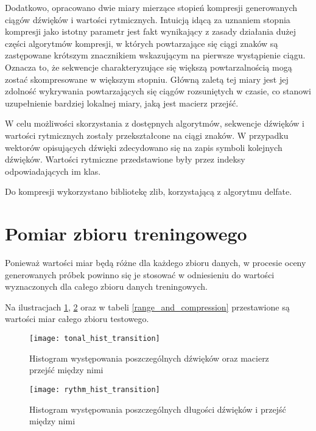 {{        Dodatkowo, opracowano dwie miary mierzące stopień kompresji generowanych ciągów dźwięków i wartości rytmicznych. 
        Intuicją idącą za uznaniem stopnia kompresji jako istotny parametr jest fakt wynikający z zasady działania dużej części
        algorytmów kompresji, w których powtarzające się ciągi znaków są zastępowane krótszym znacznikiem wskazującym na pierwsze 
        wystąpienie ciągu. 
        Oznacza to, że sekwencje charakteryzujące się większą powtarzalnością mogą zostać skompresowane w większym stopniu.
        Główną zaletą tej miary jest jej zdolność wykrywania powtarzających się ciągów rozsuniętych w czasie, co stanowi uzupełnienie 
        bardziej lokalnej miary, jaką jest macierz przejść.

        W celu możliwości skorzystania z dostępnych algorytmów, sekwencje dźwięków i wartości rytmicznych zostały przekształcone
        na ciągi znaków. W przypadku wektorów opisujących dźwięki zdecydowano się na zapis symboli kolejnych dźwięków. Wartości
        rytmiczne przedstawione były przez indeksy odpowiadających im klas. 

        Do kompresji wykorzystano bibliotekę zlib, korzystającą z algorytmu delfate.
    }

    \section{Pomiar zbioru treningowego}
    {
        Ponieważ wartości miar będą różne dla każdego zbioru danych, w procesie oceny generowanych próbek powinno się je 
        stosować w odniesieniu do wartości wyznaczonych dla całego zbioru danych treningowych.
        
        Na ilustracjach \ref{tonal_hist_transition}, \ref{rythm_hist_transition} oraz w tabeli \ref{range_and_compression} 
        przestawione są wartości miar całego zbioru testowego.

        \begin{figure}
            \centering
            \texttt{[image: tonal\_hist\_transition]}
            \caption{Histogram występowania poszczególnych dźwięków oraz macierz przejść między nimi}
            \label{tonal_hist_transition}
        \end{figure}

        \begin{figure}
            \centering
            \texttt{[image: rythm\_hist\_transition]}
            \caption{Histogram występowania poszczególnych długości dźwięków i przejść między nimi}
            \label{rythm_hist_transition}
        \end{figure}

}}
